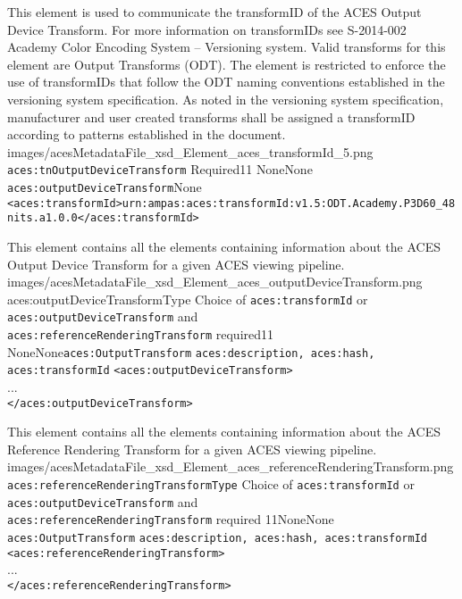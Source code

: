         {This element is used to communicate the transformID of the ACES Output Device Transform.  For more information on transformIDs see S-2014-002 Academy Color Encoding System -- Versioning system.  Valid transforms for this element are Output Transforms (ODT).  The element is restricted to enforce the use of transformIDs that follow the ODT naming conventions established in the versioning system specification.  As noted in the versioning system specification, manufacturer and user created transforms shall be assigned a transformID according to patterns established in the document.}
        {images/acesMetadataFile_xsd_Element_aces_transformId_5.png}
        {\texttt{aces:tnOutputDeviceTransform}}
        {Required}{1}{1}
        {None}{None}
        {\texttt{aces:outputDeviceTransform}}{None}
        {\lstinline{<aces:transformId>urn:ampas:aces:transformId:v1.5:ODT.Academy.P3D60_48nits.a1.0.0</aces:transformId>}}

        {This element contains all the elements containing information about the ACES Output Device Transform for a given ACES viewing pipeline.}
        {images/acesMetadataFile_xsd_Element_aces_outputDeviceTransform.png}
        {aces:outputDeviceTransformType}
        {Choice of \texttt{aces:transformId} or \texttt{aces:outputDeviceTransform} and \\  \texttt{aces:referenceRenderingTransform} required}{1}{1}
        {None}{None}{\texttt{aces:OutputTransform}}
        {\texttt{aces:description, aces:hash, aces:transformId}}
        {\lstinline{<aces:outputDeviceTransform>} \\
        ... \\
        \lstinline{</aces:outputDeviceTransform>}}

        {This element contains all the elements containing information about the ACES Reference Rendering Transform for a given ACES viewing pipeline.}
        {images/acesMetadataFile_xsd_Element_aces_referenceRenderingTransform.png}
        {\texttt{aces:referenceRenderingTransformType}}
        {Choice of \texttt{aces:transformId} or \texttt{aces:outputDeviceTransform} and \\  \texttt{aces:referenceRenderingTransform} required}
        {1}{1}{None}{None}
        {\texttt{aces:OutputTransform}}
        {\texttt{aces:description, aces:hash, aces:transformId}}
        {\lstinline{<aces:referenceRenderingTransform>} \\
        ... \\
        \lstinline{</aces:referenceRenderingTransform>}}

